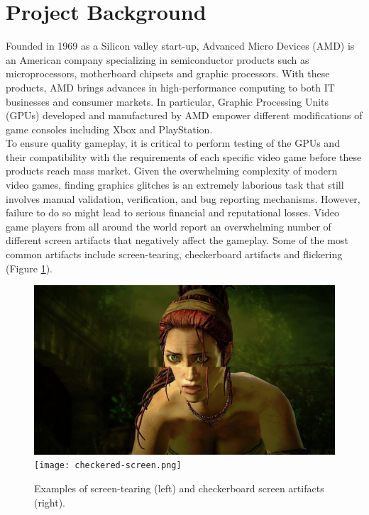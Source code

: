 \documentclass[12pt]{article}
\begin{document}
\section{Project Background}
Founded in 1969 as a Silicon valley start-up, Advanced Micro Devices (AMD) is an American company specializing in semiconductor products such as microprocessors, motherboard chipsets and graphic processors. With these products, AMD brings advances in high-performance computing to both IT businesses and consumer markets. In particular, Graphic Processing Units (GPUs) developed and manufactured by AMD empower different modifications of game consoles  including Xbox and PlayStation.\\

\noindent To ensure quality gameplay, it is critical to perform testing of the GPUs and their compatibility with the requirements of each specific video game before these products reach mass market. Given the overwhelming complexity of modern video games, finding graphics glitches is an extremely laborious task that still involves manual validation,  verification, and bug reporting mechanisms. However, failure to do so might lead to serious financial and reputational losses. Video game players from all around the world report an overwhelming number of different screen artifacts that negatively affect the gameplay. Some of the most common artifacts include screen-tearing, checkerboard artifacts and flickering (Figure \ref{fig:1}).
\begin{figure}[!ht]
\centering
\includegraphics[scale=0.15]{screen-tearing.jpg}
\texttt{[image: checkered-screen.png]}
\caption{Examples of screen-tearing (left) and checkerboard screen artifacts (right).} %
\label{fig:1}
\end{figure}\\
\end{document}
